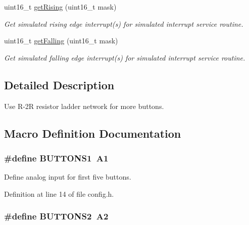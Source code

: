 \begin{DoxyCompactItemize}
uint16\+\_\+t \hyperlink{group__buttons_ga9b1decfe9116af4b8853a02aebfa1d14}{get\+Rising} (uint16\+\_\+t mask)
\begin{DoxyCompactList}\small\item\em Get simulated rising edge interrupt(s) for simulated interrupt service routine. \end{DoxyCompactList}\item 
uint16\+\_\+t \hyperlink{group__buttons_ga2971d62e0d7420f71836fb86e0fce92f}{get\+Falling} (uint16\+\_\+t mask)
\begin{DoxyCompactList}\small\item\em Get simulated falling edge interrupt(s) for simulated interrupt service routine. \end{DoxyCompactList}\end{DoxyCompactItemize}


\subsection{Detailed Description}
Use R-\/2R resistor ladder network for more buttons. 



\subsection{Macro Definition Documentation}
\subsubsection[{\texorpdfstring{B\+U\+T\+T\+O\+N\+S1}{BUTTONS1}}]{\setlength{\rightskip}{0pt plus 5cm}\#define B\+U\+T\+T\+O\+N\+S1~A1}\hypertarget{group__buttons_gab47d09cf51ee6fbdc1b7b255f57ec896}{}\label{group__buttons_gab47d09cf51ee6fbdc1b7b255f57ec896}


Define analog input for first five buttons. 



Definition at line 14 of file config.\+h.

\subsubsection[{\texorpdfstring{B\+U\+T\+T\+O\+N\+S2}{BUTTONS2}}]{\setlength{\rightskip}{0pt plus 5cm}\#define B\+U\+T\+T\+O\+N\+S2~A2}\hypertarget{group__buttons_gac3f0a90f8f8169f919f346be1ea485db}{}\label{group__buttons_gac3f0a90f8f8169f919f346be1ea485db}


